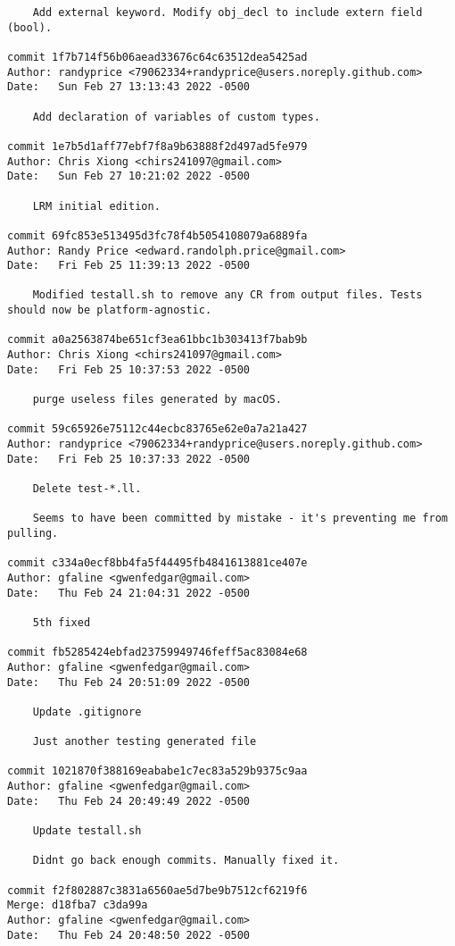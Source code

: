 {\begin{verbatim}
    Add external keyword. Modify obj_decl to include extern field (bool).

commit 1f7b714f56b06aead33676c64c63512dea5425ad
Author: randyprice <79062334+randyprice@users.noreply.github.com>
Date:   Sun Feb 27 13:13:43 2022 -0500

    Add declaration of variables of custom types.

commit 1e7b5d1aff77ebf7f8a9b63888f2d497ad5fe979
Author: Chris Xiong <chirs241097@gmail.com>
Date:   Sun Feb 27 10:21:02 2022 -0500

    LRM initial edition.

commit 69fc853e513495d3fc78f4b5054108079a6889fa
Author: Randy Price <edward.randolph.price@gmail.com>
Date:   Fri Feb 25 11:39:13 2022 -0500

    Modified testall.sh to remove any CR from output files. Tests should now be platform-agnostic.

commit a0a2563874be651cf3ea61bbc1b303413f7bab9b
Author: Chris Xiong <chirs241097@gmail.com>
Date:   Fri Feb 25 10:37:53 2022 -0500

    purge useless files generated by macOS.

commit 59c65926e75112c44ecbc83765e62e0a7a21a427
Author: randyprice <79062334+randyprice@users.noreply.github.com>
Date:   Fri Feb 25 10:37:33 2022 -0500

    Delete test-*.ll.
    
    Seems to have been committed by mistake - it's preventing me from pulling.

commit c334a0ecf8bb4fa5f44495fb4841613881ce407e
Author: gfaline <gwenfedgar@gmail.com>
Date:   Thu Feb 24 21:04:31 2022 -0500

    5th fixed

commit fb5285424ebfad23759949746feff5ac83084e68
Author: gfaline <gwenfedgar@gmail.com>
Date:   Thu Feb 24 20:51:09 2022 -0500

    Update .gitignore
    
    Just another testing generated file

commit 1021870f388169eababe1c7ec83a529b9375c9aa
Author: gfaline <gwenfedgar@gmail.com>
Date:   Thu Feb 24 20:49:49 2022 -0500

    Update testall.sh
    
    Didnt go back enough commits. Manually fixed it.

commit f2f802887c3831a6560ae5d7be9b7512cf6219f6
Merge: d18fba7 c3da99a
Author: gfaline <gwenfedgar@gmail.com>
Date:   Thu Feb 24 20:48:50 2022 -0500


\end{verbatim}}
